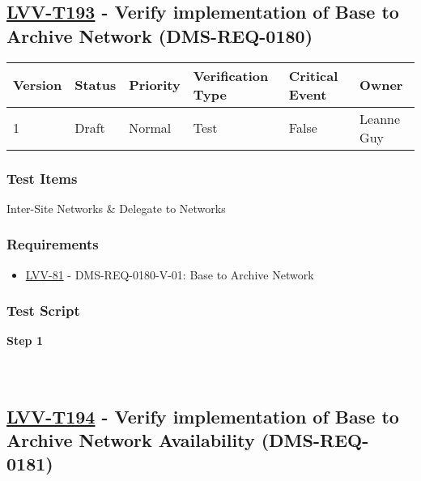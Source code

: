 \hypertarget{lvv-t193---verify-implementation-of-base-to-archive-network-dms-req-0180}{%
\subsection{\texorpdfstring{\href{https://jira.lsstcorp.org/secure/Tests.jspa\#/testCase/LVV-T193}{LVV-T193}
- Verify implementation of Base to Archive Network
(DMS-REQ-0180)}{LVV-T193 - Verify implementation of Base to Archive Network (DMS-REQ-0180)}}\label{lvv-t193---verify-implementation-of-base-to-archive-network-dms-req-0180}}

\begin{longtable}[]{@{}llllll@{}}
\toprule
Version & Status & Priority & Verification Type & Critical Event &
Owner\tabularnewline
\midrule
\endhead
1 & Draft & Normal & Test & False & Leanne Guy\tabularnewline
\bottomrule
\end{longtable}

\hypertarget{test-items-169}{%
\subsubsection{Test Items}\label{test-items-169}}

Inter-Site Networks \& Delegate to Networks

\hypertarget{requirements-170}{%
\subsubsection{Requirements}\label{requirements-170}}

\begin{itemize}
\tightlist
\item
  \href{https://jira.lsstcorp.org/browse/LVV-81}{LVV-81} -
  DMS-REQ-0180-V-01: Base to Archive Network
\end{itemize}

\hypertarget{test-script-170}{%
\subsubsection{Test Script}\label{test-script-170}}

\textbf{Step 1}\\
~\\
~\\

\hypertarget{lvv-t194---verify-implementation-of-base-to-archive-network-availability-dms-req-0181}{%
\subsection{\texorpdfstring{\href{https://jira.lsstcorp.org/secure/Tests.jspa\#/testCase/LVV-T194}{LVV-T194}
- Verify implementation of Base to Archive Network Availability
(DMS-REQ-0181)}{LVV-T194 - Verify implementation of Base to Archive Network Availability (DMS-REQ-0181)}}\label{lvv-t194---verify-implementation-of-base-to-archive-network-availability-dms-req-0181}}

